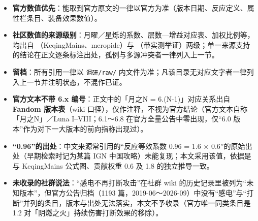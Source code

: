 \begin{itemize}
\item \textbf{官方数值优先}：能取到官方原文的一律以官方为准（版本日期、反应定义、属性栏条目、装备效果数值）。
\item \textbf{社区数值的来源级别}：月曜／星烁的系数、层数—增益对应表、加权比例等，均出自 （KeqingMains、meropide）与 （带实测举证）两级；单一来源支持的结论在正文逐条标注出处，孤例与多源冲突者一律列入上一节。
\item \textbf{留档}：所有引用一律以 \texttt{调研/raw/} 内文件为准；凡该目录无对应文字者一律列入上一节并注明状态，不混作已证。
\item \textbf{官方文本不带 6.x 编号}：正文中的「月之N = 6.(N-1)」对应关系出自 \textbf{Fandom 版本表}（wiki 口径），仅作注释，不视为官方结论（官方文本自称「月之N」／Luna I–VIII；6.1～6.8 在官方全量公告中零出现，仅“6.0 版本”作为对下一大版本的前向指称出现过）。
\item \textbf{“0.96”的出处}：中文来源常引用的“反应等效系数 0.96 = 1.6 × 0.6”的原始出处（早期检索时记为某篇 IGN 中国攻略）未能复现；本文采用该值，依据是与 KeqingMains 公式图、贡献权重 0.6 及 1.8 的独立推导一致。
\item \textbf{未收录的社群说法}：“感电不再打断攻击”在社群 wiki 的历史记录里被列为“未知版本”，但官方公告归档（1193 篇，2019-06～2026-09）中没有“感电”与“打断”并列的条目，版本与出处无法落实，本文不予收录（官方唯一同类条目是 1.2 对「阴燃之火」持续伤害打断效果的移除）。
\end{itemize}

